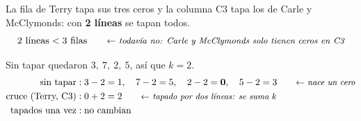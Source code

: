 \documentclass[11pt,a4paper]{article}
\let\pasobase\paso
\renewcommand{\paso}[1]{\needspace{7\baselineskip}\pasobase{#1}}
\newcommand{\marco}[3]{%
  \foreach \i in {2,...,#2} \foreach \j in {2,...,#3}
    \draw[gray!60, very thin] (#1-\i-\j.north west) rectangle (#1-\i-\j.south east);
  \draw[semithick] (#1-2-2.north west) rectangle (#1-#2-#3.south east);}
\newcommand{\tfila}[3]{\draw[tapa] (#1-#2-2.west) -- (#1-#2-#3.east);}
\newcommand{\tcol}[3]{\draw[tapa] (#1-2-#2.north) -- (#1-#3-#2.south);}
\newcommand{\pie}[2]{\node[below=1.5mm of #1, font=\scriptsize\itshape] {#2};}
\newcommand{\flecha}[3]{\draw[-{Stealth[length=2.4mm]}, thick, shorten >=1mm] (#1.east) -- node[above, font=\scriptsize, align=center] {#3} (#1.east -| #2.west);}
\begin{document}
\begin{center}
\end{center}
La fila de Terry tapa sus tres ceros y la columna C3 tapa los de Carle y McClymonds: con \textbf{2 líneas} se
tapan todos.
\[
2 \text{ líneas} < 3 \text{ filas} \nota{todavía no: Carle y McClymonds solo tienen ceros en C3}
\]

Sin tapar quedaron $3,\ 7,\ 2,\ 5$, así que $k = 2$.
\begin{align*}
\text{sin tapar} &: 3 - 2 = 1,\quad 7 - 2 = 5,\quad 2 - 2 = \mathbf{0},\quad 5 - 2 = 3 \nota{nace un cero}\\
\text{cruce (Terry, C3)} &: 0 + 2 = 2 \nota{tapado por dos líneas: se suma $k$}\\
\text{tapados una vez} &: \text{no cambian}
\end{align*}
\end{document}
